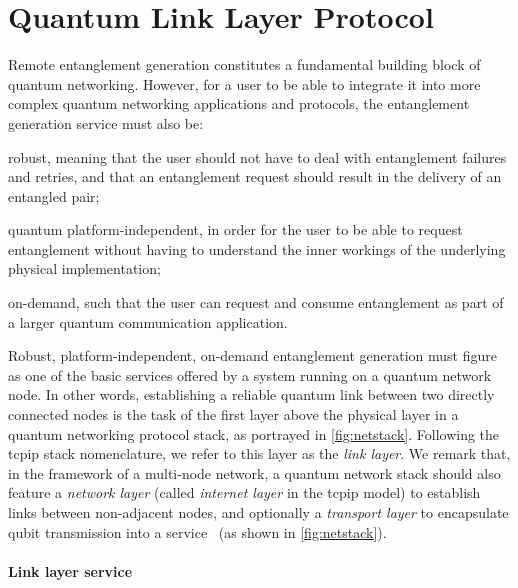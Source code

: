\section{Quantum Link Layer Protocol}
\label{sec:netstack:link}

Remote entanglement generation constitutes a fundamental building block of quantum networking.
However, for a user to be able to integrate it into more complex quantum networking applications and
protocols, the entanglement generation service must also be:
%
\begin{enumerate*}[label=(\alph*)]
    \item robust, meaning that the user should not have to deal with entanglement failures and
          retries, and that an entanglement request should result in the delivery of an entangled
          pair;
    \item quantum platform-independent, in order for the user to be able to request entanglement
          without having to understand the inner workings of the underlying physical implementation;
    \item on-demand, such that the user can request and consume entanglement as part of a larger
          quantum communication application.
\end{enumerate*}
Robust, platform-independent, on-demand entanglement generation must figure as one of the basic
services offered by a system running on a quantum network node. In other words, establishing a
reliable quantum link between two directly connected nodes is the task of the first layer above the
physical layer in a quantum networking protocol stack, as portrayed in \cref{fig:netstack}.
Following the \acrshort{tcpip} stack nomenclature, we refer to this layer as the \emph{link layer}.
We remark that, in the framework of a multi-node network, a quantum network stack should also
feature a \emph{network layer} (called \emph{internet layer} in the \acrshort{tcpip} model) to
establish links between non-adjacent nodes, and optionally a \emph{transport layer} to encapsulate
qubit transmission into a service~\cite{dahlberg_2019_egp, kozlowski_2020_qnp, pirker_2019_quantum}
(as shown in \cref{fig:netstack}).

\paragraph{Link layer service}

